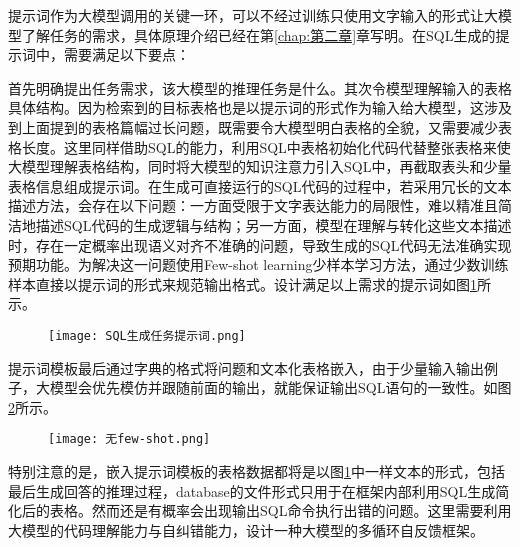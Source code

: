 提示词作为大模型调用的关键一环，可以不经过训练只使用文字输入的形式让大模型了解任务的需求，具体原理介绍已经在第\ref{chap:第二章}章写明。在SQL生成的提示词中，需要满足以下要点：

首先明确提出任务需求，该大模型的推理任务是什么。其次令模型理解输入的表格具体结构。因为检索到的目标表格也是以提示词的形式作为输入给大模型，这涉及到上面提到的表格篇幅过长问题，既需要令大模型明白表格的全貌，又需要减少表格长度。这里同样借助SQL的能力，利用SQL中表格初始化代码代替整张表格来使大模型理解表格结构，同时将大模型的知识注意力引入SQL中，再截取表头和少量表格信息组成提示词。在生成可直接运行的SQL代码的过程中，若采用冗长的文本描述方法，会存在以下问题：一方面受限于文字表达能力的局限性，难以精准且简洁地描述SQL代码的生成逻辑与结构；另一方面，模型在理解与转化这些文本描述时，存在一定概率出现语义对齐不准确的问题，导致生成的SQL代码无法准确实现预期功能。为解决这一问题使用Few-shot learning少样本学习方法，通过少数训练样本直接以提示词的形式来规范输出格式。设计满足以上需求的提示词如图\ref{fig:4-5}所示。
\begin{figure}[h]
    \centering
    \texttt{[image: SQL生成任务提示词.png]}
    \label{fig:4-5}
\end{figure}

提示词模板最后通过字典的格式将问题和文本化表格嵌入，由于少量输入输出例子，大模型会优先模仿并跟随前面的输出，就能保证输出SQL语句的一致性。如图\ref{fig:4-6}所示。
\begin{figure}[h]
    \centering
    \texttt{[image: 无few-shot.png]}
    \label{fig:4-6}
\end{figure}
特别注意的是，嵌入提示词模板的表格数据都将是以图\ref{fig:4-5}中一样文本的形式，包括最后生成回答的推理过程，database的文件形式只用于在框架内部利用SQL生成简化后的表格。然而还是有概率会出现输出SQL命令执行出错的问题。这里需要利用大模型的代码理解能力与自纠错能力，设计一种大模型的多循环自反馈框架。

